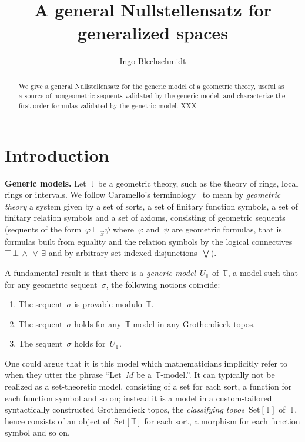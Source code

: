 \documentclass[oneside,reqno]{amsart}
\title{A general Nullstellensatz for generalized spaces}
\author{Ingo Blechschmidt}
\theoremstyle{definition}
\theoremstyle{plain}
\theoremstyle{remark}
\newcommand{\TT}{\mathbb{T}}
\newcommand{\Set}{\mathrm{Set}}
\renewcommand{\_}{\mathpunct{.}\,}
\newcommand{\?}{\,{:}\,}
\renewcommand{\paragraph}[1]{\noindent\textbf{#1.}}
\newcommand{\seq}[1]{\mathrel{\vdash\!\!\!_{#1}}}
\begin{document}
\begin{abstract}
  We give a general Nullstellensatz for the generic model of a
  geometric theory, useful as a source of nongeometric sequents validated by
  the generic model, and characterize the first-order formulas validated by the
  genetric model. XXX
\end{abstract}

\maketitle
\thispagestyle{empty}

\section{Introduction}

\paragraph{Generic models} Let~$\TT$ be a geometric theory, such as the theory
of rings, local rings or intervals. We follow Caramello's
terminology~\cite{caramello:tst} to mean by \emph{geometric theory} a system
given by a set of sorts, a set of finitary function symbols, a set of finitary
relation symbols and a set of axioms, consisting of geometric sequents
(sequents of the form~$\varphi \seq{\vec x} \psi$ where~$\varphi$ and~$\psi$
are geometric formulas, that is formulas built from equality and the relation
symbols by the logical connectives~${\top}\,{\bot}\,{\wedge}\,{\vee}\,{\exists}$
and by arbitrary set-indexed disjunctions~$\bigvee$).

A fundamental result is that there is a \emph{generic model}~$U_\TT$ of~$\TT$,
a model such that for any geometric sequent~$\sigma$, the following notions
coincide: \begin{enumerate} \item The sequent~$\sigma$ is provable
modulo~$\TT$. \item The sequent~$\sigma$ holds for any~$\TT$-model in any
Grothendieck topos. \item The sequent~$\sigma$ holds for~$U_\TT$.
\end{enumerate} One could argue that it is this model which mathematicians
implicitly refer to when they utter the phrase ``Let~$M$ be a~$\TT$-model.''. It can
typically not be realized as a set-theoretic model, consisting of a set for
each sort, a function for each function symbol and so on; instead it is a model
in a custom-tailored syntactically constructed Grothendieck topos, the
\emph{classifying topos}~$\Set[\TT]$ of~$\TT$, hence consists of an object
of~$\Set[\TT]$ for each sort, a morphism for each function symbol and so on.
\end{document}
